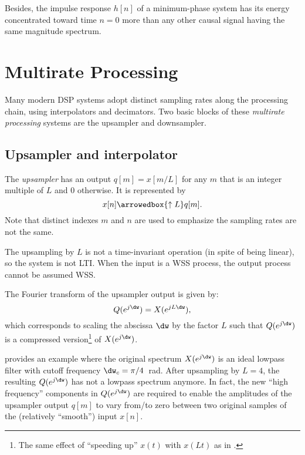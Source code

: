 Besides, the impulse response $h[n]$ of a minimum-phase system has its energy concentrated toward time $n=0$
more than any other causal signal having the same magnitude spectrum.


\section{{\akadvanced} Multirate Processing}
\label{sec:updownsampler}

Many modern DSP systems adopt distinct sampling rates along the processing chain, using interpolators and decimators. Two basic blocks of these \emph{multirate processing}  systems are the upsampler and downsampler.

\subsection{Upsampler and interpolator}

The \emph{upsampler} has an output $q[m] = x[m/L]$ for any $m$ that is an integer multiple of $L$ and 0 otherwise. It is represented by
\[
x[n] \arrowedbox{\uparrow{L}} q[m].
\] 
Note that distinct indexes $m$ and $n$ are used to emphasize the sampling rates are not the same.

The upsampling by $L$ is not a time-invariant operation (in spite of being linear), so the system is not LTI. When the input is a WSS process, the output process cannot be assumed WSS.

The Fourier transform of the upsampler output is given by: 
\begin{equation}
Q(e^{j\dw} )= X(e^{jL\dw}),
\label{eq:upsampledPSDDiscreteTime}
\end{equation}
which corresponds to scaling the abscissa $\dw$ by the factor $L$ such that $Q(e^{j\dw} )$ is a  compressed version\footnote{The same effect of ``speeding up'' $x(t)$ with $x(Lt)$ as in .} of $X(e^{j\dw})$. 

 provides an example where the original spectrum $X(e^{j\dw})$ is an
ideal lowpass filter with cutoff frequency $\dw_c=\pi/4$~rad. After upsampling by $L=4$, the
resulting $Q(e^{j\dw})$ has not a lowpass spectrum anymore. In fact, the new ``high frequency''
components in $Q(e^{j\dw})$ are required to enable the amplitudes of the upsampler output $q[m]$ to vary from/to zero between two original samples of the (relatively ``smooth'') input $x[n]$.

